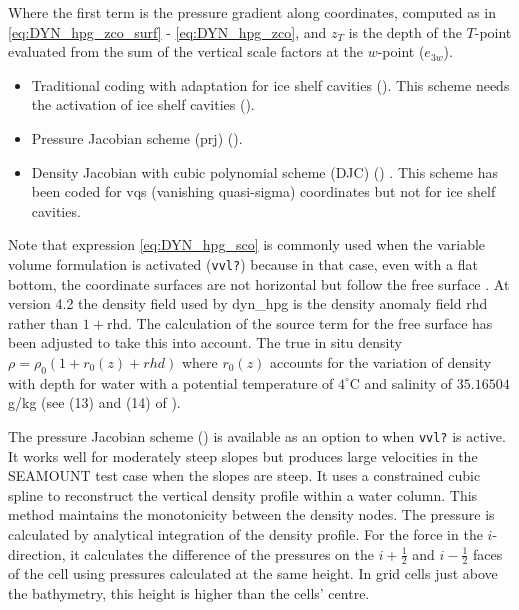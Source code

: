 \documentclass[../main/NEMO_manual]{subfiles}
\begin{document}
Where the first term is the pressure gradient along coordinates,
computed as in \autoref{eq:DYN_hpg_zco_surf} - \autoref{eq:DYN_hpg_zco},
and $z_T$ is the depth of the $T$-point evaluated from the sum of the vertical scale factors at the $w$-point
($e_{3w}$).

\begin{itemize}
\item
Traditional coding with adaptation for ice shelf cavities ().
This scheme needs the activation of ice shelf cavities ().

\item
Pressure Jacobian scheme (prj) (). 

\item
Density Jacobian with cubic polynomial scheme (DJC) () 
\citep{shchepetkin.mcwilliams_OM05}. This scheme has been coded for vqs (vanishing
quasi-sigma) coordinates but not for ice shelf cavities.
\end{itemize}

Note that expression \autoref{eq:DYN_hpg_sco} is commonly used when the variable volume formulation is activated
(\texttt{vvl?}) because in that case, even with a flat bottom,
the coordinate surfaces are not horizontal but follow the free surface \citep{levier.treguier.ea_trpt07}.
At version 4.2 the density field used by dyn\_hpg is the density anomaly field rhd rather than $1+\mathrm{rhd}$. 
The calculation of the source term for the free surface has been adjusted to take this into account. 
The true in situ density $\rho= \rho_0 (1 + r_0(z) + rhd )$ where $r_0(z)$ accounts for the variation of density
with depth for water with a potential temperature of $4^{\circ}$C and salinity of $35.16504$g/kg 
(see (13) and (14) of \citet{roquet.madec.ea_OM15}).        

The pressure Jacobian scheme () is available as
an option to  when \texttt{vvl?} is active.
It works well for moderately steep slopes but produces large velocities in the SEAMOUNT test case 
when the slopes are steep. It uses a constrained cubic spline to
reconstruct the vertical density profile within a water column.
This method maintains the monotonicity between the density nodes.
The pressure is calculated by analytical integration of the density profile.
For the force in the $i$-direction, it calculates the difference of the pressures on the 
$i+\tfrac{1}{2}$ and $i-\tfrac{1}{2}$ faces of the cell using pressures calculated at the same height. 
In grid cells just above the bathymetry, this height is higher than the cells' centre.  
\end{document}
